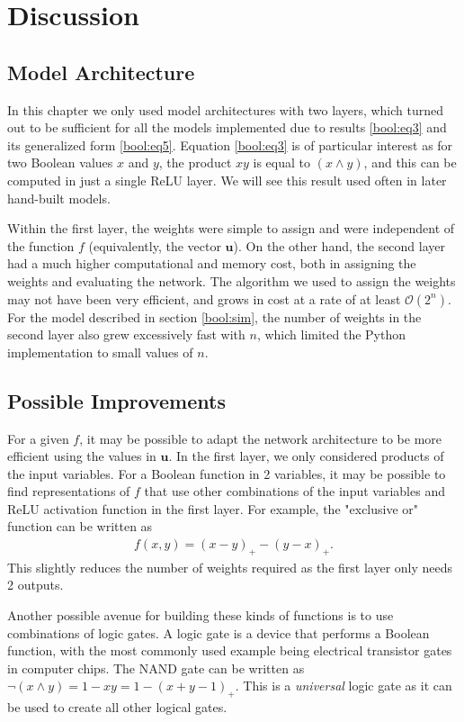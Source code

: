 \documentclass{somasmsc}
\begin{document}
\section{Discussion}

\subsection{Model Architecture}

In this chapter we only used model architectures with two layers, which turned out to be sufficient for all the models implemented due to results \ref{bool:eq3} and its generalized form \ref{bool:eq5}. Equation \ref{bool:eq3} is of particular interest as for two Boolean values $x$ and $y$, the product $xy$ is equal to $\left(x \land y\right)$, and this can be computed in just a single ReLU layer. We will see this result used often in later hand-built models.

Within the first layer, the weights were simple to assign and were independent of the function $f$ (equivalently, the vector $\pmb{u}$). On the other hand, the second layer had a much higher computational and memory cost, both in assigning the weights and evaluating the network. The algorithm we used to assign the weights may not have been very efficient, and grows in cost at a rate of at least $\mathcal{O}\left(2^n\right)$. For the model described in section \ref{bool:sim}, the number of weights in the second layer also grew excessively fast with $n$, which limited the Python implementation to small values of $n$.

\subsection{Possible Improvements}

For a given $f$, it may be possible to adapt the network architecture to be more efficient using the values in $\pmb{u}$. In the first layer, we only considered products of the input variables. For a Boolean function in 2 variables, it may be possible to find representations of $f$ that use other combinations of the input variables and ReLU activation function in the first layer. For example, the "exclusive or" function can be written as
\begin{align*}
f(x, y) = \left(x - y\right)_+ - \left(y - x\right)_+.
\end{align*}
This slightly reduces the number of weights required as the first layer only needs 2 outputs.

Another possible avenue for building these kinds of functions is to use combinations of logic gates. A logic gate is a device that performs a Boolean function, with the most commonly used example being electrical transistor gates in computer chips. The NAND gate can be written as $\lnot\left(x \land y\right) = 1 - xy = 1 - \left(x + y - 1\right)_+$. This is a \textit{universal} logic gate as it can be used to create all other logical gates.
\end{document}
